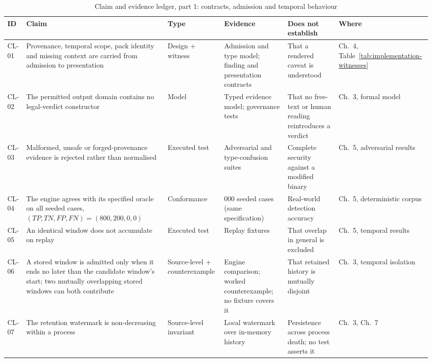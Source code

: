 \begin{table}[H]
\centering
\caption{Claim and evidence ledger, part 1: contracts, admission and temporal behaviour}
\label{tab:claim-ledger}
\scriptsize
\setlength{\tabcolsep}{3pt}
\begin{tabular}{>{\raggedright\arraybackslash}p{}>{\raggedright\arraybackslash}p{}>{\raggedright\arraybackslash}p{}>{\raggedright\arraybackslash}p{}>{\raggedright\arraybackslash}p{}>{\raggedright\arraybackslash}p{}}
\toprule
ID & Claim & Type & Evidence & Does not establish & Where \\
\midrule
CL-01 & Provenance, temporal scope, pack identity and missing context are carried from admission to presentation & Design + witness & Admission and type model; finding and presentation contracts & That a rendered caveat is understood & Ch.~4, Table~\ref{tab:implementation-witnesses} \\
CL-02 & The permitted output domain contains no legal-verdict constructor & Model & Typed evidence model; governance tests & That no free-text or human reading reintroduces a verdict & Ch.~3, formal model \\
CL-03 & Malformed, unsafe or forged-provenance evidence is rejected rather than normalised & Executed test & Adversarial and type-confusion suites & Complete security against a modified binary & Ch.~5, adversarial results \\
CL-04 & The engine agrees with its specified oracle on all seeded cases, $(TP,TN,FP,FN)=(800,200,0,0)$ & Conformance & 1{,}000 seeded cases (same specification) & Real-world detection accuracy & Ch.~5, deterministic corpus \\
CL-05 & An identical window does not accumulate on replay & Executed test & Replay fixtures & That overlap in general is excluded & Ch.~5, temporal results \\
CL-06 & A stored window is admitted only when it ends no later than the candidate window's start; two mutually overlapping stored windows can both contribute & Source-level + counterexample & Engine comparison; worked counterexample; no fixture covers it & That retained history is mutually disjoint & Ch.~3, temporal isolation \\
CL-07 & The retention watermark is non-decreasing within a process & Source-level invariant & Local watermark over in-memory history & Persistence across process death; no test asserts it & Ch.~3, Ch.~7 \\

\end{tabular}
\end{table}
